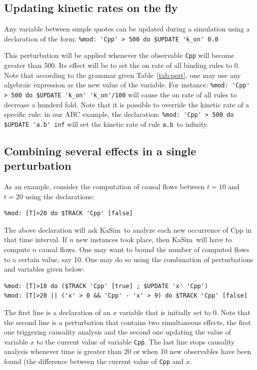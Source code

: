 \documentclass[11pt]{book}
\def\KaSim{\textsf{KaSim}}
\def\ttt#1{\texttt{#1}}
\def\var#1{{\textquotesingle}#1{\textquotesingle}}
\def\noi{\noindent}
\begin{document}
\subsection{Updating kinetic rates on the fly}

Any variable between simple quotes can be updated during a simulation using a declaration of the form:
\lstinline[language=kappa]!%mod: 'Cpp' > 500 do $UPDATE 'k_on' 0.0!

This perturbation will be applied whenever the observable \ttt{\var{Cpp}} will become greater than 500. Its effect will be to set the on rate of all binding rules to 0. Note that according to the grammar given Table~\ref{tab:pert}, one may use any algebraic expression as the new value of the variable. For instance:
\lstinline[language=kappa]!%mod: 'Cpp' > 500 do $UPDATE 'k_on' 'k_on'/100!
\noi will cause the on rate of all rules to decrease a hunderd fold. Note that it is possible to override the kinetic rate of a specific rule:  in our ABC example, the declaration:
\lstinline[language=kappa]!%mod: 'Cpp' > 500 do $UPDATE 'a.b' inf!
\noi will set the kinetic rate of rule \ttt{\var{a.b}}~to infinity.

\subsection{Combining several effects in a single perturbation}
As an example, consider the computation of causal flows between $t=10$ and $t=20$ using the declarations:
\begin{lstlisting}[language=kappa]
%mod: [T]>10 do $TRACK 'Cpp' [true]
%mod: [T]>20 do $TRACK 'Cpp' [false]
\end{lstlisting}

The above declaration will ask \KaSim~to analyze each new occurrence of \var{Cpp} in that time interval. If $n$ new instances took place, then \KaSim~will have to compute $n$ causal flows. One may want to bound the number of computed flows to a certain value, say 10. One may do so using the combination of perturbations and variables given below:
\begin{lstlisting}[language=kappa]
%var: 'x' 0
%mod: [T]>10 do ($TRACK 'Cpp' [true] ; $UPDATE 'x' 'Cpp')
%mod: [T]>20 || ('x' > 0 && 'Cpp' - 'x' > 9) do $TRACK 'Cpp' [false]
\end{lstlisting}
The first line is a declaration of an $x$ variable that is initially set to 0. Note that the second line is a perturbation that contains two simultaneous effects, the first one triggering causality analysis and the second one updating the value of variable $x$ to the current value of variable \ttt{\var{Cpp}}.
The last line stops causality analysis whenever time is greater than 20 or when 10 new observables have been found (the difference between the current value of \ttt{\var{Cpp}} and $x$.
\end{document}
